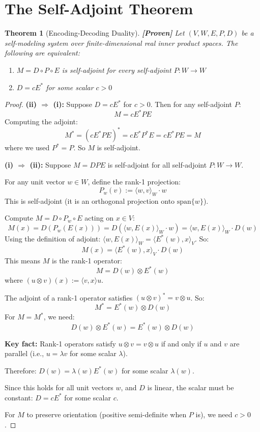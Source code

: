 \documentclass[11pt]{article}
\newtheorem{theorem}{Theorem}[section]
\theoremstyle{definition}
\theoremstyle{remark}
\begin{document}
\section{The Self-Adjoint Theorem}

\begin{theorem}[Encoding-Decoding Duality]\label{thm:ed_duality}
\textbf{[Proven]} Let $(V, W, E, P, D)$ be a self-modeling system over finite-dimensional real inner product spaces. The following are equivalent:
\begin{enumerate}[label=(\roman*)]
    \item $M = D \circ P \circ E$ is self-adjoint for every self-adjoint $P : W \to W$
    \item $D = cE^*$ for some scalar $c > 0$
\end{enumerate}
\end{theorem}

\begin{proof}
\textbf{(ii) $\Rightarrow$ (i):} Suppose $D = cE^*$ for $c > 0$. Then for any self-adjoint $P$:
\[
M = cE^* P E
\]
Computing the adjoint:
\[
M^* = (cE^* P E)^* = cE^* P^* E = cE^* P E = M
\]
where we used $P^* = P$. So $M$ is self-adjoint.

\textbf{(i) $\Rightarrow$ (ii):} Suppose $M = DPE$ is self-adjoint for all self-adjoint $P : W \to W$.

For any unit vector $w \in W$, define the rank-1 projection:
\[
P_w(v) := \langle w, v \rangle_W \cdot w
\]
This is self-adjoint (it is an orthogonal projection onto $\text{span}\{w\}$).

Compute $M = D \circ P_w \circ E$ acting on $x \in V$:
\[
M(x) = D(P_w(E(x))) = D(\langle w, E(x) \rangle_W \cdot w) = \langle w, E(x) \rangle_W \cdot D(w)
\]
Using the definition of adjoint: $\langle w, E(x) \rangle_W = \langle E^*(w), x \rangle_V$. So:
\[
M(x) = \langle E^*(w), x \rangle_V \cdot D(w)
\]
This means $M$ is the rank-1 operator:
\[
M = D(w) \otimes E^*(w)
\]
where $(u \otimes v)(x) := \langle v, x \rangle u$.

The adjoint of a rank-1 operator satisfies $(u \otimes v)^* = v \otimes u$. So:
\[
M^* = E^*(w) \otimes D(w)
\]
For $M = M^*$, we need:
\[
D(w) \otimes E^*(w) = E^*(w) \otimes D(w)
\]

\textbf{Key fact:} Rank-1 operators satisfy $u \otimes v = v \otimes u$ if and only if $u$ and $v$ are parallel (i.e., $u = \lambda v$ for some scalar $\lambda$).

Therefore: $D(w) = \lambda(w) E^*(w)$ for some scalar $\lambda(w)$.

Since this holds for all unit vectors $w$, and $D$ is linear, the scalar must be constant: $D = cE^*$ for some scalar $c$.

For $M$ to preserve orientation (positive semi-definite when $P$ is), we need $c > 0$.
\end{proof}
\end{document}
